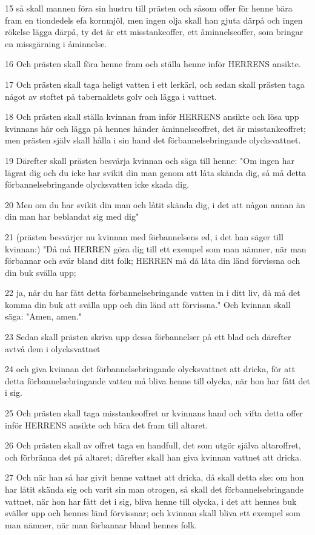 \par 15 så skall mannen föra sin hustru till prästen och såsom offer för henne bära fram en tiondedels efa kornmjöl, men ingen olja skall han gjuta därpå och ingen rökelse lägga därpå, ty det är ett misstankeoffer, ett åminnelseoffer, som bringar en missgärning i åminnelse.
\par 16 Och prästen skall föra henne fram och ställa henne inför HERRENS ansikte.
\par 17 Och prästen skall taga heligt vatten i ett lerkärl, och sedan skall prästen taga något av stoftet på tabernaklets golv och lägga i vattnet.
\par 18 Och prästen skall ställa kvinnan fram inför HERRENS ansikte och lösa upp kvinnans hår och lägga på hennes händer åminnelseoffret, det är misstankeoffret; men prästen själv skall hålla i sin hand det förbannelsebringande olycksvattnet.
\par 19 Därefter skall prästen besvärja kvinnan och säga till henne: "Om ingen har lägrat dig och du icke har svikit din man genom att låta skända dig, så må detta förbannelsebringande olycksvatten icke skada dig.
\par 20 Men om du har svikit din man och låtit skända dig, i det att någon annan än din man har beblandat sig med dig"
\par 21 (prästen besvärjer nu kvinnan med förbannelsens ed, i det han säger till kvinnan:) "Då må HERREN göra dig till ett exempel som man nämner, när man förbannar och svär bland ditt folk; HERREN må då låta din länd förvissna och din buk svälla upp;
\par 22 ja, när du har fått detta förbannelsebringande vatten in i ditt liv, då må det komma din buk att svälla upp och din länd att förvissna." Och kvinnan skall säga: "Amen, amen."
\par 23 Sedan skall prästen skriva upp dessa förbannelser på ett blad och därefter avtvå dem i olycksvattnet
\par 24 och giva kvinnan det förbannelsebringande olycksvattnet att dricka, för att detta förbannelsebringande vatten må bliva henne till olycka, när hon har fått det i sig.
\par 25 Och prästen skall taga misstankeoffret ur kvinnans hand och vifta detta offer inför HERRENS ansikte och bära det fram till altaret.
\par 26 Och prästen skall av offret taga en handfull, det som utgör själva altaroffret, och förbränna det på altaret; därefter skall han giva kvinnan vattnet att dricka.
\par 27 Och när han så har givit henne vattnet att dricka, då skall detta ske: om hon har låtit skända sig och varit sin man otrogen, så skall det förbannelsebringande vattnet, när hon har fått det i sig, bliva henne till olycka, i det att hennes buk sväller upp och hennes länd förvissnar; och kvinnan skall bliva ett exempel som man nämner, när man förbannar bland hennes folk.
